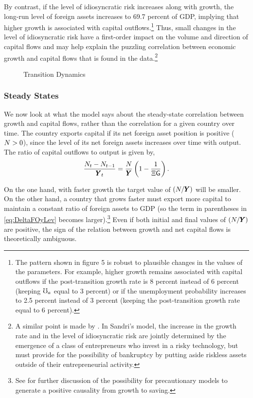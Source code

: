 \documentclass[titlepage,abstract,letterpaper]{econtex}
\renewcommand{\GDPLev}{\ensuremath{\pmb{Y}}}
\begin{document}
By contrast, if the level of idiosyncratic risk increases along with growth,
the long-run level of foreign assets increases to 69.7 percent of GDP,
implying that higher growth is associated with capital
outflows.\footnote{The pattern shown in figure 5 is robust to
  plausible changes in the values of the parameters. For example,
  higher growth remains associated with capital outflows if the
  post-transition growth rate is 8 percent instead of 6 percent
  (keeping $\mho_a$ equal to 3 percent) or if the unemployment
  probability increases to 2.5 percent instead of 3 percent (keeping
  the post-transition growth rate equal to 6 percent).} Thus, small
changes in the level of idiosyncratic risk have a first-order impact
on the volume and direction of capital flows and may help explain the
puzzling correlation between economic growth and capital flows that is
found in the data.\footnote{A similar point is made by
  \cite{sandriGrowth}. In Sandri's model, the increase in the
  growth rate and in the level of idiosyncratic risk are jointly
  determined by the emergence of a class of entrepreneurs who invest
  in a risky technology, but must provide for the possibility of
  bankruptcy by putting aside riskless assets outside of their
  entrepreneurial activity.}

\medskip

\begin{figure}
\caption{Transition Dynamics}\label{fig:transDyn}
\end{figure}
\medskip


\subsubsection{Steady States}

We now look at what the model says about the steady-state correlation between growth and capital flows, rather than the correlation for a given country over time. The country exports capital if its net foreign asset position is positive ($N>0$), since the level of its net foreign assets increases over time with output. The ratio of capital outflows to output is given by,
\begin{equation}
\frac{\NFALev_t-\NFALev_{t-1}}{\GDPLev_t}=\frac{\NFALev}{\GDPLev}\left(1 -\frac{1}{\EmpGro \WGro} \right).
\label{eq:DeltaFOyLev}
\end{equation}

On the one hand, with faster growth the target value of
$(\NFALev/\GDPLev)$ will be smaller.  On the other hand, a country
that grows faster must export more capital to maintain a constant
ratio of foreign assets to GDP (so the term in parentheses in
\eqref{eq:DeltaFOyLev} becomes larger).\footnote{See
  \cite{carroll:RiskyHabits} for further discussion of the possibility
  for precautionary models to generate a positive causality from
  growth to saving.}  Even if both initial and final values of
$(\NFALev/\GDPLev)$ are positive, the sign of the relation between
growth and net capital flows is theoretically ambiguous.
\end{document}
